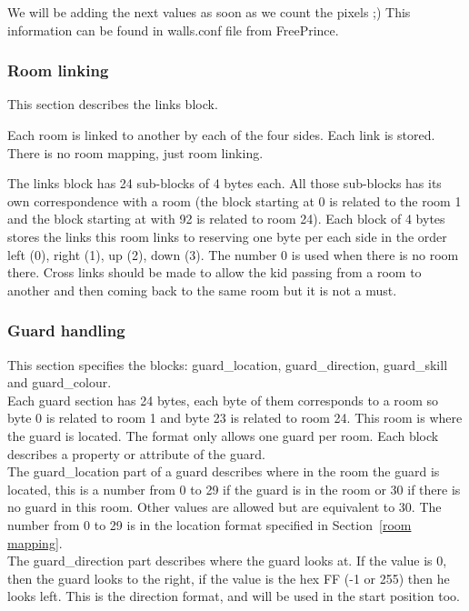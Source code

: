 \documentclass{article}
\begin{document}
 We will be adding the next values as soon as we count the pixels ;)
 This information can be found in walls.conf file from FreePrince.

\subsubsection{Room linking \label{room linking}} %
 This section describes the links block.

 Each room is linked to another by each of the four sides. Each link
 is stored. There is no room mapping, just room linking.

 The links block has 24 sub-blocks of 4 bytes each. All those sub-blocks
 has its own correspondence with a room (the block starting at 0 is
 related to the room 1 and the block starting at with 92 is related to
 room 24).
 Each block of 4 bytes stores the links this room links to reserving one
 byte per each side in the order left (0), right (1), up (2), down (3).
 The number 0 is used when there is no room there.
 Cross links should be made to allow the kid passing from a room to
 another and then coming back to the same room but it is not a must.

\subsubsection{Guard handling\label{guard handling}} %
 This section specifies the blocks: guard\_location, guard\_direction,
 guard\_skill and guard\_colour.\\

 Each guard section has 24 bytes, each byte of them corresponds to a room
 so byte 0 is related to room 1 and byte 23 is related to room 24.
 This room is where the guard is located. The format only allows one
 guard per room. Each block describes a property or attribute of the guard.\\

 The guard\_location part of a guard describes where in the room the guard
 is located, this is a number from 0 to 29 if the guard is in the room or
 30 if there is no guard in this room. Other values are allowed but are
 equivalent to 30. The number from 0 to 29 is in the location format
 specified in Section~\ref{room mapping}.\\

 The guard\_direction part describes where the guard looks at. If the value
 is 0, then the guard looks to the right, if the value is the hex FF (-1 or
 255) then he looks left. This is the direction format, and will be used in
 the start position too.
\end{document}
